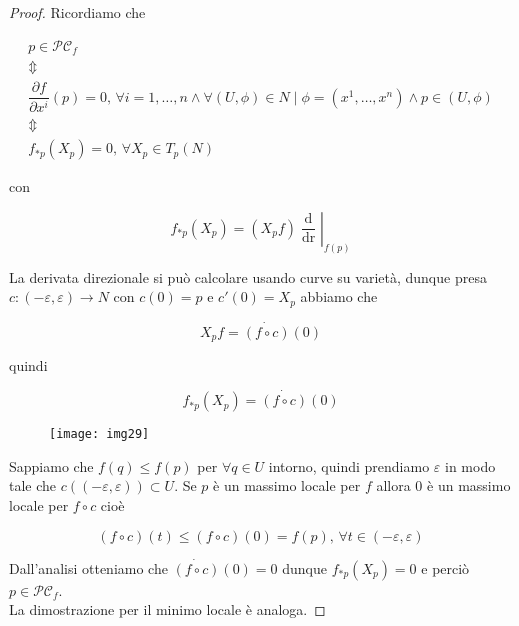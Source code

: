 \begin{proof}
	Ricordiamo che
	
	\begin{gather}
		p \in \mathcal{PC}_{f}\nonumber\\
		\Updownarrow\nonumber\\
		\dfrac{\partial f}{\partial x^{i}} (p) = 0, \, \forall i=1,\dots,n \wedge \forall (U,\phi) \in N \mid \phi = (x^{1},\dots,x^{n}) \wedge p \in (U,\phi)\nonumber\\
		\Updownarrow\\
		f_{*p}(X_{p}) = 0, \, \forall X_{p} \in T_{p}(N)\nonumber
	\end{gather}

	con
	
	\begin{equation}
		f_{*p}(X_{p}) = (X_{p} f) \left. \dfrac{\operatorname{d}}{\operatorname{dr}} \right|_{f(p)}
	\end{equation}

	La derivata direzionale si può calcolare usando curve su varietà, dunque presa $ c : (-\varepsilon,\varepsilon) \to N $ con $ c(0) = p $ e $ c'(0) = X_{p} $ abbiamo che
	
	\begin{equation}
		X_{p} f = \dot{(f \circ c)}(0)
	\end{equation}

	quindi
	
	\begin{equation}
		f_{*p}(X_{p}) = \dot{(f \circ c)}(0)
	\end{equation}

	\begin{figure}[H]
		\centering
		\texttt{[image: img29]}
	\end{figure}
	
	Sappiamo che $ f(q) \leqslant f(p) $ per $ \forall q \in U $ intorno, quindi prendiamo $ \varepsilon $ in modo tale che $ c((-\varepsilon,\varepsilon)) \subset U $. Se $ p $ è un massimo locale per $ f $ allora 0 è un massimo locale per $ f \circ c $ cioè
	
	\begin{equation}
		(f \circ c)(t) \leqslant (f \circ c)(0) = f(p), \, \forall t \in (-\varepsilon,\varepsilon)
	\end{equation}

	Dall'analisi otteniamo che $ \dot{(f \circ c)}(0) = 0 $ dunque $ f_{*p}(X_{p}) = 0 $ e perciò $ p \in \mathcal{PC}_{f} $.\\	
	La dimostrazione per il minimo locale è analoga.
\end{proof}

